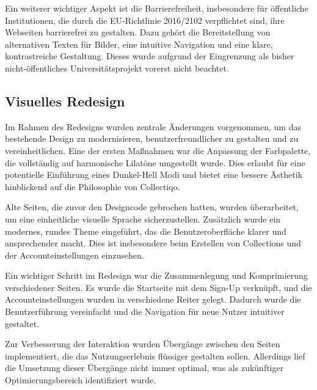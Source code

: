 Ein weiterer wichtiger Aspekt ist die Barrierefreiheit, insbesondere für öffentliche Institutionen, die durch die EU-Richtlinie 2016/2102 verpflichtet sind, ihre Webseiten barrierefrei zu gestalten.
Dazu gehört die Bereitstellung von alternativen Texten für Bilder, eine intuitive Navigation und eine klare, kontrastreiche Gestaltung.
Dieses wurde aufgrund der Eingrenzung als bisher nicht-öffentliches Universitätsprojekt vorerst nicht beachtet.

\parencite{GIDF.2024}

\subsection{Visuelles Redesign}\label{subsec:subsection-three-two}

Im Rahmen des Redesigns wurden zentrale Änderungen vorgenommen, um das bestehende Design zu modernisieren, benutzerfreundlicher zu gestalten und zu vereinheitlichen.
Eine der ersten Maßnahmen war die Anpassung der Farbpalette, die vollständig auf harmonische Lilatöne umgestellt wurde.
Dies erlaubt für eine potentielle Einführung eines Dunkel-Hell Modi und bietet eine bessere Ästhetik hinblickend auf die Philosophie von Collectiqo.

Alte Seiten, die zuvor den Designcode gebrochen hatten, wurden überarbeitet, um eine einheitliche visuelle Sprache sicherzustellen.
Zusätzlich wurde ein modernes, rundes Theme eingeführt, das die Benutzeroberfläche klarer und ansprechender macht.
Dies ist insbesondere beim Erstellen von Collections und der Accounteinstellungen einzusehen.

Ein wichtiger Schritt im Redesign war die Zusammenlegung und Komprimierung verschiedener Seiten.
Es wurde die Startseite mit dem Sign-Up verknüpft, und die Accounteinstellungen wurden in verschiedene Reiter gelegt.
Dadurch wurde die Benutzerführung vereinfacht und die Navigation für neue Nutzer intuitiver gestaltet.

Zur Verbesserung der Interaktion wurden Übergänge zwischen den Seiten implementiert, die das Nutzungserlebnis flüssiger gestalten sollen.
Allerdings lief die Umsetzung dieser Übergänge nicht immer optimal, was als zukünftiger Optimierungsbereich identifiziert wurde.
